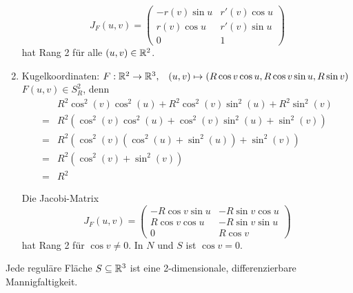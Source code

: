 \begin{beispiel}
\begin{enumerate}[label=\arabic*)]
            \[J_F(u,v) = 
            \begin{pmatrix}
                -r(v) \sin u & r'(v) \cos u\\
                r(v) \cos u  & r'(v) \sin u\\
                 0           & 1
            \end{pmatrix}\]
            hat Rang 2 für alle $(u,v) \in \mathbb{R}^2$.
        \item Kugelkoordinaten: $F: \mathbb{R}^2 \rightarrow \mathbb{R}^3, \;\;\; (u, v) \mapsto (R \cos v \cos u, R \cos v \sin u, R \sin v)$
              $F(u,v) \in S_R^2$, denn 
                \begin{align*}
                    & R^2 \cos^2(v) \cos^2(u) + R^2 \cos^2(v) \sin^2(u) + R^2 \sin^2(v)\\
                    =& R^2 (\cos^2(v) \cos^2(u) + \cos^2(v) \sin^2(u) + \sin^2(v))\\
                    =& R^2 \left (\cos^2(v) (\cos^2(u) + \sin^2(u)) + \sin^2(v) \right)\\
                    =& R^2 \left (\cos^2(v) + \sin^2(v) \right)\\
                    =&R^2
                \end{align*}

                Die Jacobi-Matrix
                \[J_F(u,v) = 
                \begin{pmatrix}
                    -R \cos v \sin u & -R \sin v \cos u\\
                    R \cos v \cos u  & -R \sin v \sin u\\
                    0                & R \cos v
                \end{pmatrix}\]
                hat Rang 2 für $\cos v \neq 0$. In $N$ und $S$ ist
                $\cos v = 0$.
    \end{enumerate}
\end{beispiel}

\begin{korollar}\label{kor:regular-surface-mannigfaltigkeit}
    Jede reguläre Fläche $S \subseteq \mathbb{R}^3$ ist eine 2-dimensionale,
    differenzierbare Mannigfaltigkeit.
\end{korollar}

